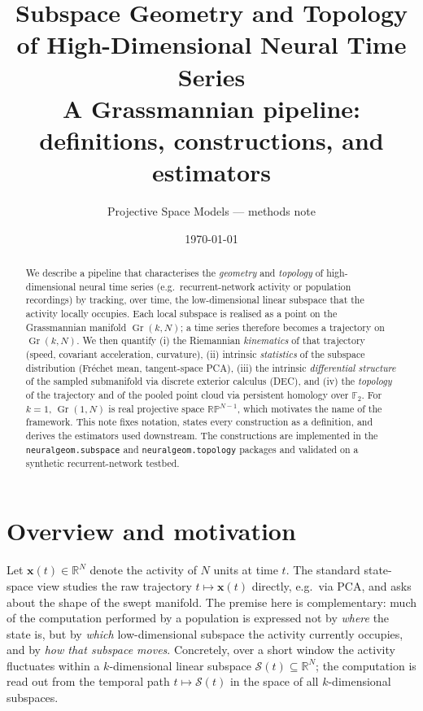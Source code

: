 \documentclass[11pt]{article}
\title{\textbf{Subspace Geometry and Topology of High-Dimensional Neural Time Series}\\[4pt]
\large A Grassmannian pipeline: definitions, constructions, and estimators}
\author{Projective Space Models --- methods note}
\date{\today}
\newcommand{\R}{\mathbb{R}}
\newcommand{\Gr}{\operatorname{Gr}}
\newcommand{\RP}{\mathbb{RP}}
\newcommand{\Fld}{\mathbb{F}}
\theoremstyle{definition}
\begin{document}
\maketitle

\begin{abstract}
\noindent
We describe a pipeline that characterises the \emph{geometry} and \emph{topology} of
high-dimensional neural time series (e.g.\ recurrent-network activity or population
recordings) by tracking, over time, the low-dimensional linear subspace that the
activity locally occupies. Each local subspace is realised as a point on the
Grassmannian manifold $\Gr(k,N)$; a time series therefore becomes a trajectory on
$\Gr(k,N)$. We then quantify (i) the Riemannian \emph{kinematics} of that trajectory
(speed, covariant acceleration, curvature), (ii) intrinsic \emph{statistics} of the
subspace distribution (Fr\'echet mean, tangent-space PCA), (iii) the intrinsic
\emph{differential structure} of the sampled submanifold via discrete exterior
calculus (DEC), and (iv) the \emph{topology} of the trajectory and of the pooled
point cloud via persistent homology over $\Fld_2$. For $k=1$, $\Gr(1,N)$ is real
projective space $\RP^{N-1}$, which motivates the name of the framework. This note
fixes notation, states every construction as a definition, and derives the
estimators used downstream. The constructions are implemented in the
\texttt{neuralgeom.subspace} and \texttt{neuralgeom.topology} packages and
validated on a synthetic recurrent-network testbed.
\end{abstract}

\tableofcontents

\section{Overview and motivation}
\label{sec:overview}

Let $\bm{x}(t)\in\R^N$ denote the activity of $N$ units at time $t$. The standard
state-space view studies the raw trajectory $t\mapsto\bm{x}(t)$ directly, e.g.\ via
PCA, and asks about the shape of the swept manifold. The premise here is
complementary: much of the computation performed by a population is expressed not
by \emph{where} the state is, but by \emph{which} low-dimensional subspace the
activity currently occupies, and by \emph{how that subspace moves}. Concretely,
over a short window the activity fluctuates within a $k$-dimensional linear subspace
$\mathcal{S}(t)\subseteq\R^N$; the computation is read out from the temporal path
$t\mapsto\mathcal{S}(t)$ in the space of all $k$-dimensional subspaces.
\end{document}
